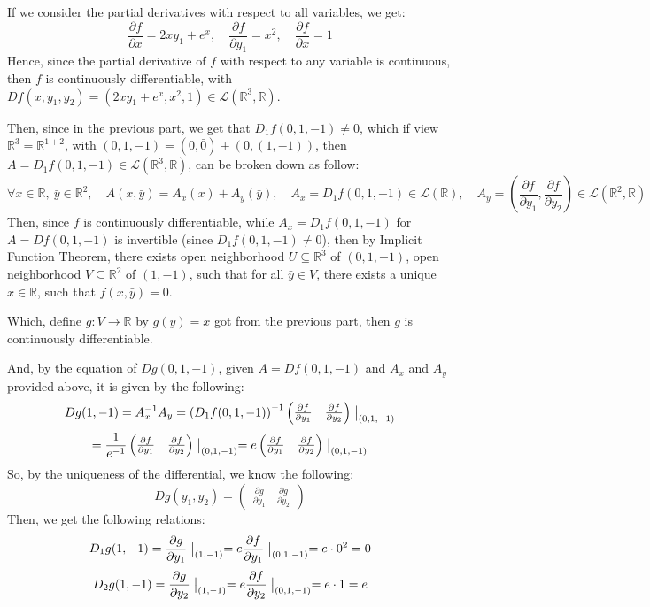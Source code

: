 \documentclass{article}
\begin{document}
If we consider the partial derivatives with respect to all variables, we get:
$$\frac{\partial f}{\partial x}=2xy_1+e^x,\quad \frac{\partial f}{\partial y_1} = x^2,\quad \frac{\partial f}{\partial x} = 1$$
Hence, since the partial derivative of $f$ with respect to any variable is continuous, then $f$ is continuously differentiable, with $Df(x,y_1,y_2) = (2xy_1+e^x, x^2, 1)\in\mathcal{L}(\mathbb{R}^3,\mathbb{R})$.

Then, since in the previous part, we get that $D_1f(0,1,-1) \neq 0$, which if view $\mathbb{R}^3 = \mathbb{R}^{1+2}$, with $(0,1,-1) = (0,\bar{0}) + (0,(1,-1))$, then $A = D_1f(0,1,-1)\in\mathcal{L}(\mathbb{R}^3,\mathbb{R})$, can be broken down as follow:
$$\forall x\in\mathbb{R},\ \bar{y}\in\mathbb{R}^2,\quad A(x,\bar{y}) = A_x(x)+A_y(\bar{y}),\quad A_x = D_1f(0,1,-1)\in\mathcal{L}(\mathbb{R}),\quad A_y = \left(\frac{\partial f}{\partial y_1},\frac{\partial f}{\partial y_2}\right)\in\mathcal{L}(\mathbb{R}^2,\mathbb{R})$$
Then, since $f$ is continuously differentiable, while $A_x=D_1f(0,1,-1)$ for $A=Df(0,1,-1)$ is invertible (since $D_1f(0,1,-1) \neq 0$), then by Implicit Function Theorem, there exists open neighborhood $U\subseteq\mathbb{R}^3$ of $(0,1,-1)$, open neighborhood $V\subseteq \mathbb{R}^2$ of $(1,-1)$, such that for all $\bar{y}\in V$, there exists a unique $x\in \mathbb{R}$, such that $f(x,\bar{y}) = 0$.

Which, define $g:V\rightarrow\mathbb{R}$ by $g(\bar{y}) = x$ got from the previous part, then $g$ is continuously differentiable.

And, by the equation of $Dg(0,1,-1)$, given $A = Df(0,1,-1)$ and $A_x$ and $A_y$ provided above, it is given by the following:
$$Dg(1,-1) = A_x^{-1}A_y = \left(D_1f(0,1,-1)\right)^{-1}\begin{pmatrix}\frac{\partial f}{\partial y_1} & \frac{\partial f}{\partial y_2}\end{pmatrix}\bigm|_{(0,1,-1)}$$
$$ = \frac{1}{e^{-1}}\begin{pmatrix}\frac{\partial f}{\partial y_1} & \frac{\partial f}{\partial y_2}\end{pmatrix}\bigm|_{(0,1,-1)} = e\begin{pmatrix}\frac{\partial f}{\partial y_1} & \frac{\partial f}{\partial y_2}\end{pmatrix}\bigm|_{(0,1,-1)}$$
So, by the uniqueness of the differential, we know the following: 
$$Dg(y_1,y_2) = \begin{pmatrix}
    \frac{\partial g}{\partial y_1} & \frac{\partial g}{\partial y_2}
\end{pmatrix}$$
Then, we get the following relations:
$$D_1g(1,-1)=\frac{\partial g}{\partial y_1}\bigm|_{(1,-1)} = e\frac{\partial f}{\partial y_1}\bigm|_{(0,1,-1)} = e\cdot 0^2 = 0$$
$$D_2g(1,-1)=\frac{\partial g}{\partial y_2}\bigm|_{(1,-1)} = e\frac{\partial f}{\partial y_2}\bigm|_{(0,1,-1)} = e\cdot 1 = e$$
 
\end{document}

